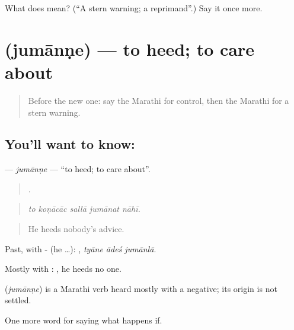 \begin{tcolorbox}[breakable,colback=teal!4,colframe=teal!35!black,title={Before you move on}]
What does  mean? (\textquotedblleft{}A stern warning; a reprimand\textquotedblright{}.) Say it once more.
\end{tcolorbox}
\section[\texorpdfstring{\mr{जुमानणे} (jumānṇe)}{जुमानणे (jumānṇe)}]{ (jumānṇe) — to heed; to care about}

\label{lesson:MR-C542-jumanne}



\begin{quote}
Before the new one: say the Marathi for control, then the Marathi for a stern warning.
\end{quote}

\subsection*{You'll want to know: }
\textbf{} — \emph{jumānṇe} — \textquotedblleft{}to heed; to care about\textquotedblright{}.

\begin{quote}
    .
\end{quote}

\begin{quote}
\emph{to koṇācāc sallā jumānat nāhī.}
\end{quote}

\begin{quote}
He heeds nobody's advice.
\end{quote}

Past, with - (he …):   , \emph{tyāne ādeś jumānlā}.

Mostly with :    , he heeds no one.

\begin{cousinweb}
\textbf{} (\emph{jumānṇe}) is a Marathi verb heard mostly with a negative; its origin is not settled.
\end{cousinweb}

\begin{grammarlens}[title={What you've built}]
One more word for saying what happens if.
\end{grammarlens}

